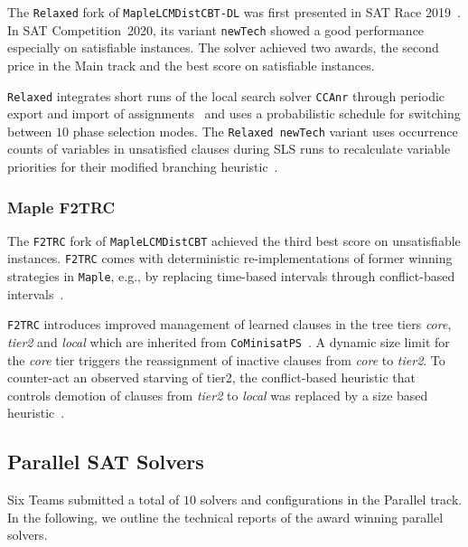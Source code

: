 \documentclass{elsarticle}
\newcommand{\solver}[1]{\texttt{#1}}
\begin{document}
The \solver{Relaxed} fork of \solver{MapleLCMDistCBT-DL} was first presented in SAT Race 2019~\cite{Xindi:SC2019}. 
In SAT Competition~2020, its variant \solver{newTech} showed a good performance especially on satisfiable instances. 
The solver achieved two awards, the second price in the Main track and the best score on satisfiable instances. 

\solver{Relaxed} integrates short runs of the local search solver \solver{CCAnr} through periodic export and import of assignments~\cite{Xindi:SC2019} and uses a probabilistic schedule for switching between $10$ phase selection modes. 
The \solver{Relaxed newTech} variant uses occurrence counts of variables in unsatisfied clauses during SLS runs to recalculate variable priorities for their modified branching heuristic~\cite{Xindi:SC2020}. 


\subsubsection{Maple F2TRC}

The \solver{F2TRC} fork of \solver{MapleLCMDistCBT} achieved the third best score on unsatisfiable instances. 
\solver{F2TRC} comes with deterministic re-implementations of former winning strategies in \solver{Maple}, e.g., by replacing time-based intervals through conflict-based intervals~\cite{Kochemazov:SC2020}. 

\solver{F2TRC} introduces improved management of learned clauses in the tree tiers \emph{core}, \emph{tier2} and \emph{local} which are inherited from \solver{CoMinisatPS}~\cite{Oh:2015:satunsat}.
A dynamic size limit for the \emph{core} tier triggers the reassignment of inactive clauses from \emph{core} to \emph{tier2}. 
To counter-act an observed starving of tier2, the conflict-based heuristic that controls demotion of clauses from \emph{tier2} to \emph{local} was replaced by a size based heuristic~\cite{Kochemazov:SC2020}. 


\subsection{Parallel SAT Solvers}
\label{sec:part:par}

Six Teams submitted a total of $10$ solvers and configurations in the Parallel track. 
In the following, we outline the technical reports of the award winning parallel solvers. 
\end{document}
